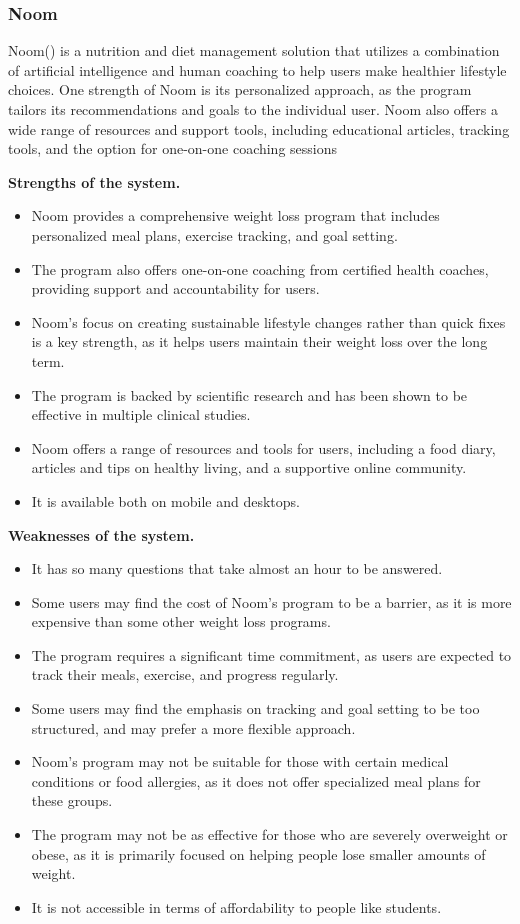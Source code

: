 \documentclass{article}
\begin{document}
\subsubsection{Noom}
Noom(\cite{noon}) is a nutrition and diet management solution that utilizes a combination of artificial intelligence and human coaching to help users make healthier lifestyle choices. One strength of Noom is its personalized approach, as the program tailors its recommendations and goals to the individual user. Noom also offers a wide range of resources and support tools, including educational articles, tracking tools, and the option for one-on-one coaching sessions


\textbf{Strengths of the system.}
\begin{itemize}
\item Noom provides a comprehensive weight loss program that includes personalized meal plans, exercise tracking, and goal setting.
\item The program also offers one-on-one coaching from certified health coaches, providing support and accountability for users.
\item Noom's focus on creating sustainable lifestyle changes rather than quick fixes is a key strength, as it helps users maintain their weight loss over the long term.
\item The program is backed by scientific research and has been shown to be effective in multiple clinical studies.
\item Noom offers a range of resources and tools for users, including a food diary, articles and tips on healthy living, and a supportive online community.
\item It is available both on mobile and desktops.
\end{itemize}

\textbf{Weaknesses of the system.}
\begin{itemize}
\item It has so many questions that take almost an hour to be answered.
\item Some users may find the cost of Noom's program to be a barrier, as it is more expensive than some other weight loss programs.
\item The program requires a significant time commitment, as users are expected to track their meals, exercise, and progress regularly.
\item Some users may find the emphasis on tracking and goal setting to be too structured, and may prefer a more flexible approach.
\item Noom's program may not be suitable for those with certain medical conditions or food allergies, as it does not offer specialized meal plans for these groups.
\item The program may not be as effective for those who are severely overweight or obese, as it is primarily focused on helping people lose smaller amounts of weight.
\item It is not accessible in terms of affordability to people like students.
\end{itemize}
\end{document}

